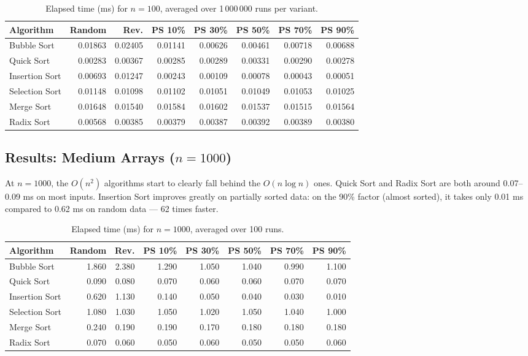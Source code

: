 \documentclass[12pt,a4paper]{article}
\theoremstyle{definition}
\begin{document}
\begin{table}[h!]
\centering
\caption{Elapsed time (ms) for $n=100$, averaged over 1\,000\,000 runs per variant.}
\label{tab:n100}
\small
\begin{tabular}{lrrrrrrr}
\toprule
\textbf{Algorithm} & \textbf{Random} & \textbf{Rev.} & \textbf{PS 10\%} & \textbf{PS 30\%} & \textbf{PS 50\%} & \textbf{PS 70\%} & \textbf{PS 90\%} \\
\midrule
Bubble Sort     & 0.01863 & 0.02405 & 0.01141 & 0.00626 & 0.00461 & 0.00718 & 0.00688 \\
Quick Sort      & 0.00283 & 0.00367 & 0.00285 & 0.00289 & 0.00331 & 0.00290 & 0.00278 \\
Insertion Sort  & 0.00693 & 0.01247 & 0.00243 & 0.00109 & 0.00078 & 0.00043 & 0.00051 \\
Selection Sort  & 0.01148 & 0.01098 & 0.01102 & 0.01051 & 0.01049 & 0.01053 & 0.01025 \\
Merge Sort      & 0.01648 & 0.01540 & 0.01584 & 0.01602 & 0.01537 & 0.01515 & 0.01564 \\
Radix Sort      & 0.00568 & 0.00385 & 0.00379 & 0.00387 & 0.00392 & 0.00389 & 0.00380 \\
\bottomrule
\end{tabular}
\end{table}

\subsection{Results: Medium Arrays ($n = 1000$)}

At $n=1000$, the $O(n^2)$ algorithms start to clearly fall behind the $O(n \log n)$ ones. Quick Sort and Radix Sort are both around 0.07--0.09 ms on most inputs. Insertion Sort improves greatly on partially sorted data: on the 90\% factor (almost sorted), it takes only 0.01 ms compared to 0.62 ms on random data --- 62 times faster.

\begin{table}[h!]
\centering
\caption{Elapsed time (ms) for $n=1000$, averaged over 100 runs.}
\label{tab:n1000}
\small
\begin{tabular}{lrrrrrrr}
\toprule
\textbf{Algorithm} & \textbf{Random} & \textbf{Rev.} & \textbf{PS 10\%} & \textbf{PS 30\%} & \textbf{PS 50\%} & \textbf{PS 70\%} & \textbf{PS 90\%} \\
\midrule
Bubble Sort     & 1.860 & 2.380 & 1.290 & 1.050 & 1.040 & 0.990 & 1.100 \\
Quick Sort      & 0.090 & 0.080 & 0.070 & 0.060 & 0.060 & 0.070 & 0.070 \\
Insertion Sort  & 0.620 & 1.130 & 0.140 & 0.050 & 0.040 & 0.030 & 0.010 \\
Selection Sort  & 1.080 & 1.030 & 1.050 & 1.020 & 1.050 & 1.040 & 1.000 \\
Merge Sort      & 0.240 & 0.190 & 0.190 & 0.170 & 0.180 & 0.180 & 0.180 \\
Radix Sort      & 0.070 & 0.060 & 0.050 & 0.060 & 0.050 & 0.050 & 0.060 \\
\bottomrule
\end{tabular}
\end{table}
\end{document}
